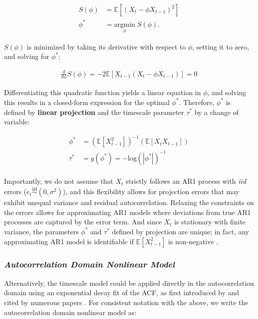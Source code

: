 \documentclass[main.tex]{subfiles}
\begin{document}
\begin{align}
    S(\phi) &= \mathbb{E}[(X_t - \phi X_{t-1})^2]\\
    \phi^* &= \underset{\phi}{\text{argmin}} \; S(\phi).
\end{align}

\noindent $S(\phi)$ is minimized by taking its derivative with respect to $\phi$, setting it to zero, and solving for $\phi^*$:

\begin{align}
    \frac{d}{d\phi} S(\phi) = -2 \mathbb{E}[X_{t-1}(X_t - \phi X_{t-1})] = 0
\end{align}

\noindent Differentiating this quadratic function yields a linear equation in $\phi$, and solving this results in a closed-form expression for the optimal $\phi^*$. Therefore, $\phi^*$ is defined by \textbf{linear projection} and the timescale parameter $\tau^*$ by a change of variable:

\begin{align}
    \phi^* &= (\mathbb{E}[X_{t-1}^2])^{-1}(\mathbb{E}[X_t X_{t-1}]) \label{eq:ar1-phi}\\
    \tau^* &= g(\phi^*) = -{\text{log}(|\phi^*|)}^{-1} \label{eq:ar1-tau}
\end{align}
\\

Importantly, we do not assume that $X_t$ strictly follows an AR1 process with \textit{iid} errors ($e_t \overset{\text{iid}}{\sim} (0, \sigma^2)$), and this flexibility allows for projection errors that may exhibit unequal variance and residual autocorrelation. Relaxing the constraints on the errors allows for approximating AR1 models where deviations from true AR1 processes are captured by the error term. And since $X_t$ is stationary with finite variance, the parameters $\phi^*$ and $\tau^*$ defined by projection are unique; in fact, any approximating AR1 model is identifiable if $\mathbb{E}[X_{t-1}^2]$ is non-negative \citep[theorem~14.28]{hansen_econometrics_2022}.\\

\subsubsection{\normalfont\textit{Autocorrelation Domain Nonlinear Model}}\label{sec:autocorrelation-domain-nonlinear-model}

Alternatively, the timescale model could be applied directly in the autocorrelation domain using an exponential decay fit of the ACF, as first introduced by \citet{murray_hierarchy_2014} and cited by numerous papers \citep{rossi-pool_invariant_2021, cirillo_neural_2018, ito_cortical_2020, runyan_distinct_2017, zeraati_flexible_2022, nougaret_intrinsic_2021, wasmuht_intrinsic_2018, muller_core_2020, maisson_choice-relevant_2021, li_hierarchical_2022, shafiei_topographic_2020}. For consistent notation with the  above, we write the autocorrelation domain nonlinear model as:
\end{document}
